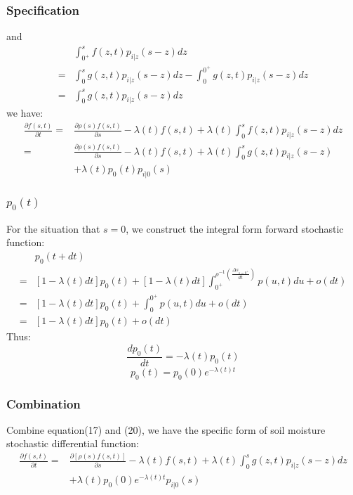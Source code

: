 \documentclass{beamer}
\begin{document}
\begin{frame}
\frametitle{Specification}
and
 \begin{equation}
 \begin{split}
 &\int_{0^+}^{s} f(z,t)p_{i|z}(s-z)dz\\=&\int_{0}^{s} g(z,t)p_{i|z}(s-z)dz-\int_{0}^{0^+} g(z,t)p_{i|z}(s-z)dz\\=&\int_{0}^{s} g(z,t)p_{i|z}(s-z)dz
 \end{split}
 \end{equation}
 we have:
 \begin{equation}
 \begin{split}
 \frac{\partial{f(s,t)}}{\partial t}=&\frac{\partial{\rho(s)f(s,t)}}{\partial s}-\lambda(t)f(s,t)+\lambda(t)\int_{0}^{s} f(z,t)p_{i|z}(s-z)dz\\=&\frac{\partial{\rho(s)f(s,t)}}{\partial s}-\lambda(t)f(s,t)+\lambda(t)\int_{0}^{s} g(z,t)p_{i|z}(s-z)\\&+\lambda(t)p_0(t)p_{i|0}(s)
 \end{split}
 \end{equation}
\end{frame}
\begin{frame}
\frametitle{$p_0(t)$}
 For the situation that $s=0$, we construct the integral form forward stochastic function:
 \begin{equation}
 \begin{split}
 &p_0(t+dt)\\=&[1-\lambda(t)dt]p_0(t)+[1-\lambda(t)dt]\int_{0^+}^{\rho^{-1}(\frac{\Delta s_{s=0^+}}{dt})}p(u,t)du+o(dt)\\=&[1-\lambda(t)dt]p_0(t)+\int_0^{0^+} p(u,t)du+o(dt)\\=&[1-\lambda(t)dt]p_0(t)+o(dt)
 \end{split}
 \end{equation} 
 Thus:
 \begin{equation}
 \frac{dp_0(t)}{dt}=-\lambda(t) p_0(t)
 \end{equation}
 \begin{equation}
 p_0(t)=p_0(0)e^{-\lambda(t) t}
 \end{equation}
 \end{frame}
 \begin{frame}
 \frametitle{Combination}
 Combine equation(17) and (20), we have the specific form of soil moisture stochastic differential function:  
 \begin{equation}
 \begin{split}
 \frac{\partial{f(s,t)}}{\partial t}=&\frac{\partial{[\rho(s)f(s,t)]}}{\partial s}-\lambda(t)f(s,t)+\lambda(t)\int_{0}^{s} g(z,t)p_{i|z}(s-z)dz\\&+\lambda(t)p_0(0)e^{-\lambda(t) t}p_{i|0}(s)
 \end{split}
 \end{equation}
 \end{frame}
\end{document}
